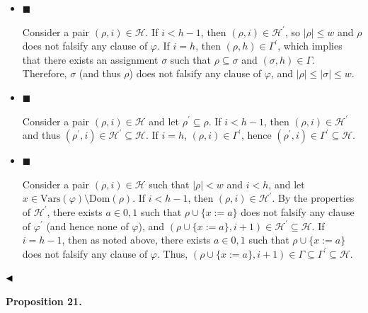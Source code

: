 \begin{itemize}


\item 
$\blacksquare$ 


Consider a pair $(\rho,i)\in\mathcal{H}$.
If $i<h-1$, then $(\rho,i)\in\mathcal{H^{\prime}}$, so $|\rho|\leq w$ and $\rho$ does not falsify any clause of $\varphi$.
If $i=h$, then $(\rho,h)\in\Gamma^{\prime}$, which implies that there exists an assignment $\sigma$ such that
$\rho\subseteq\sigma$ and $(\sigma,h)\in\Gamma$.
Therefore, $\sigma$ (and thus $\rho$) does not falsify any clause of $\varphi$, and $|\rho|\leq|\sigma|\leq w$.\par





\item 
$\blacksquare$ 


Consider a pair $(\rho,i)\in\mathcal{H}$ and let $\rho^{\prime}\subseteq\rho$.
If $i<h-1$, then $(\rho,i)\in\mathcal{H^{\prime}}$ and thus $(\rho^{\prime},i)\in\mathcal{H^{\prime}}\subseteq\mathcal{H}$.
If $i=h$, $(\rho,i)\in\Gamma^{\prime}$, hence $(\rho^{\prime},i)\in\Gamma^{\prime}\subseteq\mathcal{H}$.\par





\item 
$\blacksquare$ 


Consider a pair $(\rho,i)\in\mathcal{H}$ such that $|\rho|<w$ and $i<h$, and let $x\in\mathrm{Vars}(\varphi)\setminus\mathrm{Dom}(\rho)$.
If $i<h-1$, then $(\rho,i)\in\mathcal{H^{\prime}}$.
By the properties of $\mathcal{H^{\prime}}$, there exists $a\in{0,1}$ such that $\rho\cup\{x:=a\}$ does not falsify any clause
of $\varphi^{\prime}$ (and hence none of $\varphi$), and $(\rho\cup\{x:=a\},i+1)\in\mathcal{H^{\prime}}\subseteq\mathcal{H}$.
If $i=h-1$, then as noted above, there exists $a\in{0,1}$ such that $\rho\cup\{x:=a\}$ does not falsify any clause
of $\varphi$.
Thus, $(\rho\cup\{x:=a\},i+1)\in\Gamma\subseteq\Gamma^{\prime}\subseteq\mathcal{H}$.\par





\end{itemize}


$\hfill\blacktriangleleft$\par



\par\medskip\noindent\textbf{
Proposition 21.
}\par



